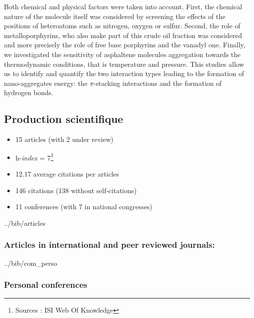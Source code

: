 \documentclass[11pt]{artuppax}
\newcounter{subsec}[section]
\begin{document}
Both chemical and physical factors were taken into account. First, the chemical nature of the molecule
itself was considered by screening the
effects of the positions of heteroatoms such as nitrogen, oxygen or sulfur. Second, the role of
metalloporphyrins, who also make part of this crude oil fraction was considered and more
precisely the role of free base porphyrins and the vanadyl one. Finally, we
investigated the sensitivity of asphaltene molecules aggregation towards the thermodynamic
conditions, that is temperature and pressure. This studies allow us to identify and quantify
the two interaction types leading to the formation of nano-aggregates energy: the $\pi$-stacking
interactions and the formation of hydrogen bonds.
%

\subsection{Production scientifique}

\singlespacing
\begin{itemize}
    \item 15 articles (with 2 under review)
    \item h-\textit{index} = 7\footnote{Sources : ISI Web Of Knowledge}
    \item 12.17 average citations per articles
    \item 146 citations (138 without self-citations)
    \item 11 conferences (with 7 in national congresses)
\end{itemize}

\begin{btSect}{../bib/articles}
    \subsubsection{Articles in international and peer reviewed journals:}
    \smallskip
    \btPrintAll
\end{btSect}

\begin{btSect}{../bib/com_perso}
    \subsubsection{Personal conferences}
    \smallskip
    \btPrintAll
\end{btSect}
\end{document}
